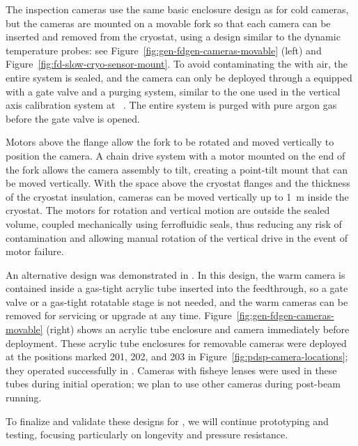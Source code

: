 The inspection cameras use the same basic
enclosure design as for cold cameras, but the cameras are mounted on a movable
fork so that each camera can be inserted and removed from the cryostat,
using a design similar to the dynamic temperature probes: see
 Figure~\ref{fig:gen-fdgen-cameras-movable} (left) and
 Figure~\ref{fig:fd-slow-cryo-sensor-mount}.  To avoid contaminating the
\lar with air, the entire system is sealed, and the
camera can only be deployed through a \fdth equipped with a gate
valve and a purging system, similar to the one used in the vertical axis
calibration system at \kamland~\cite{Banks:2014hra}. The entire system
is  purged with pure argon gas before the gate valve is opened.

Motors above the flange allow the fork to be rotated and moved vertically to position the camera. 
 A chain drive system with a motor
mounted on the end of the fork allows the camera assembly to tilt, 
creating a point-tilt mount that can be moved vertically.
With the space above the cryostat flanges and the
thickness of the cryostat insulation, cameras can be moved vertically up to
\SI{1}{m} inside the cryostat.
The motors for rotation and vertical motion are outside the sealed
volume, coupled mechanically using ferrofluidic seals, thus reducing any risk of
contamination and allowing manual rotation of the vertical
drive in the event of motor failure.  

An alternative design was demonstrated in . In this design, the warm camera is contained inside a gas-tight acrylic tube inserted into the feedthrough, so a gate valve or a gas-tight rotatable stage is not needed, and the warm cameras can be removed for servicing or upgrade at any time. Figure~\ref{fig:gen-fdgen-cameras-movable} (right) shows an acrylic tube enclosure and camera immediately before deployment. These acrylic tube enclosures for removable cameras were deployed at the positions marked 201, 202, and 203 in Figure~\ref{fig:pdsp-camera-locations}; they operated successfully in . Cameras with fisheye lenses were used in these tubes during initial operation; we plan to use other cameras during post-beam running.

To finalize and validate these designs for , we will continue prototyping and testing, focusing particularly on longevity and pressure resistance.


